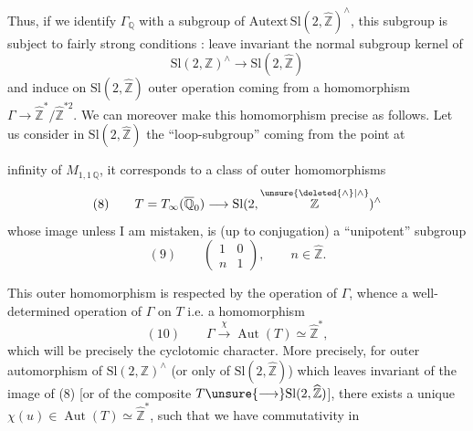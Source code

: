 
Thus, if we identify $\Gamma_{\mathbb Q}$ 
with a subgroup of $\mathrm{Autext}\,\mathrm{Sl}(2,\widehat{\mathbb Z})^{\wedge}$,
this subgroup \inserted{$\unsure{\Gamma}$} is subject to
fairly strong conditions :  leave invariant
the normal subgroup kernel of
\[
\tag{7}
\mathrm{Sl}(2,\mathbb Z)^{\wedge}\longrightarrow
\mathrm{Sl}(2,\widehat{\mathbb Z})
\]
and induce on $\mathrm{Sl}(2,\widehat{\mathbb Z})$
 outer operation
coming from a homomorphism $\Gamma\longrightarrow
\widehat{\mathbb Z}^{*}/\widehat{\mathbb Z}^{*2}$.
We can moreover make this homomorphism precise
as follows. Let us consider in $\mathrm{Sl}(2,\widehat{\mathbb Z})$ the
``loop-subgroup'' coming from the point at


infinity of $M_{1,1\,\mathbb Q}$, it corresponds
to a class of outer homomorphisms
\[
(8)\qquad
T=T_{\infty}(\overline{\mathbb Q}_{0})
\longrightarrow
\mathrm{Sl}(2,\overset{\unsure{\deleted{\wedge}|\wedge}}{\mathbb Z})^{\wedge}
\]
whose image 
unless I am mistaken, is (up to conjugation) a ``unipotent''
subgroup
\[
(9)\qquad
\left(\begin{array}{cc}1&0\\ n&1\end{array}\right),
\qquad n\in\widehat{\mathbb Z}.
\]

This outer homomorphism is respected by the operation of $\Gamma$, whence a
well-determined operation of $\Gamma$ on  $T$
i.e. a homomorphism
\[
(10)\qquad
\Gamma\xrightarrow{\chi}\operatorname{Aut}(T)
\simeq\widehat{\mathbb Z}^{*},
\]
which will be precisely the cyclotomic character.
More precisely, for  outer automorphism  of
$\mathrm{Sl}(2,\mathbb Z)^{\wedge}$ (or only of $\mathrm{Sl}(2,\widehat{\mathbb Z})$)
which leaves invariant    
of the image of (8) [or  of the composite
$T\unsure{\longrightarrow}\mathrm{Sl}(2,\widehat{\mathbb Z})$],
 there exists a unique
$\chi(u)\in\operatorname{Aut}(T)\simeq\widehat{\mathbb Z}^{*}$,
such that we have commutativity in

